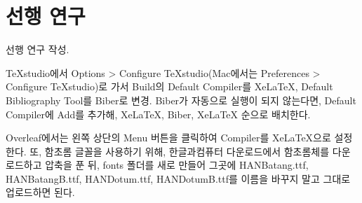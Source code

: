 \section{선행 연구}
선행 연구 작성.

TeXstudio에서 Options > Configure TeXstudio(Mac에서는 Preferences > Configure TeXstudio)로 가서 Build의 Default Compiler를 XeLaTeX, Default Bibliography Tool를 Biber로 변경. Biber가 자동으로 실행이 되지 않는다면, Default Compiler에 Add를 추가해, XeLaTeX, Biber, XeLaTeX 순으로 배치한다.

Overleaf에서는 왼쪽 상단의 Menu 버튼을 클릭하여 Compiler를 XeLaTeX으로 설정한다. 또, 함초롬 글꼴을 사용하기 위해, 한글과컴퓨터 다운로드에서 함초롬체를 다운로드하고 압축을 푼 뒤, fonts 폴더를 새로 만들어 그곳에 HANBatang.ttf, HANBatangB.ttf, HANDotum.ttf, HANDotumB.ttf를 이름을 바꾸지 말고 그대로 업로드하면 된다.